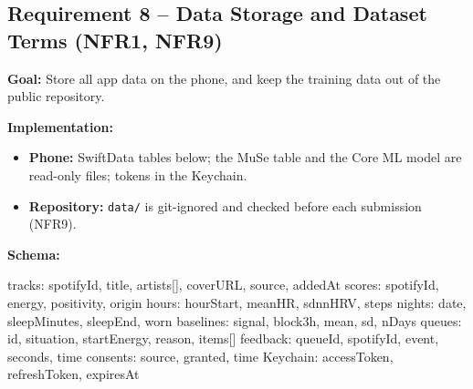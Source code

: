 \documentclass[conference]{IEEEtran}
\newcommand{\goal}[1]{\noindent\textbf{Goal:} #1\par\smallskip}
\newcommand{\impl}{\noindent\textbf{Implementation:}}
\begin{document}
\subsection{Requirement 8 -- Data Storage and Dataset Terms (NFR1, NFR9)}
\goal{Store all app data on the phone, and keep the training data out of the public repository.}
\impl
\begin{itemize}
\item \textbf{Phone:} SwiftData tables below; the MuSe table and the Core ML model are read-only files; tokens in the Keychain.
\item \textbf{Repository:} \texttt{data/} is git-ignored and checked before each submission (NFR9).
\end{itemize}
\par\noindent\begin{minipage}{\columnwidth}
\textbf{Schema:}
\begin{code}
tracks:    { spotifyId, title, artists[], coverURL,
             source, addedAt }
scores:    { spotifyId, energy, positivity, origin }
hours:     { hourStart, meanHR, sdnnHRV, steps }
nights:    { date, sleepMinutes, sleepEnd, worn }
baselines: { signal, block3h, mean, sd, nDays }
queues:    { id, situation, startEnergy, reason,
             items[] }
feedback:  { queueId, spotifyId, event, seconds, time }
consents:  { source, granted, time }
Keychain:  { accessToken, refreshToken, expiresAt }
\end{code}
\end{minipage}\par
\end{document}
